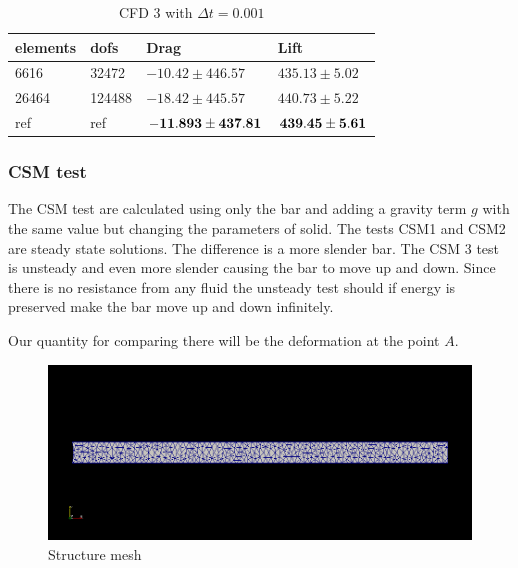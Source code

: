 \begin{table}[]
\centering
\caption{CFD 3 with $\Delta t = 0.001$}
\label{my-label}
\begin{tabular}{|l|l|l|l|}
\hline
\textbf{elements} & \textbf{dofs} & \textbf{Drag} & \textbf{Lift} \\ \hline
6616 & 32472 & $ -10.42 \pm 446.57  $ & $ 435.13 \pm 5.02 $ \\ \hline
26464 & 124488 & $ -18.42 \pm 445.57 $ & $ 440.73 \pm 5.22 $ \\ \hline
ref & ref & $\bold{ -11.893 \pm 437.81 }$ & $\bold{ 439.45 \pm 5.61 }$ \\ \hline
\end{tabular}
\end{table}

\subsubsection{CSM test}
The CSM test are calculated using only the bar and adding a gravity term $g$ with the same value but changing the parameters of solid. The tests CSM1 and CSM2 are steady state solutions. The difference is a more slender bar. The CSM 3 test is unsteady and even more slender causing the bar to move up and down. Since there is no resistance from any fluid the unsteady test should if energy is preserved make the bar move up and down infinitely. 

Our quantity for comparing there will be the deformation at the point $A$. 
\begin{center}
\begin{figure}[H]
\caption{Structure mesh}
\includegraphics[scale=0.50,trim={18mm 55mm 18mm 55mm},clip]{./Verification_Validation/Hron_Turek/structure.png}
\end{figure}
\end{center}

\vspace{0cm}

